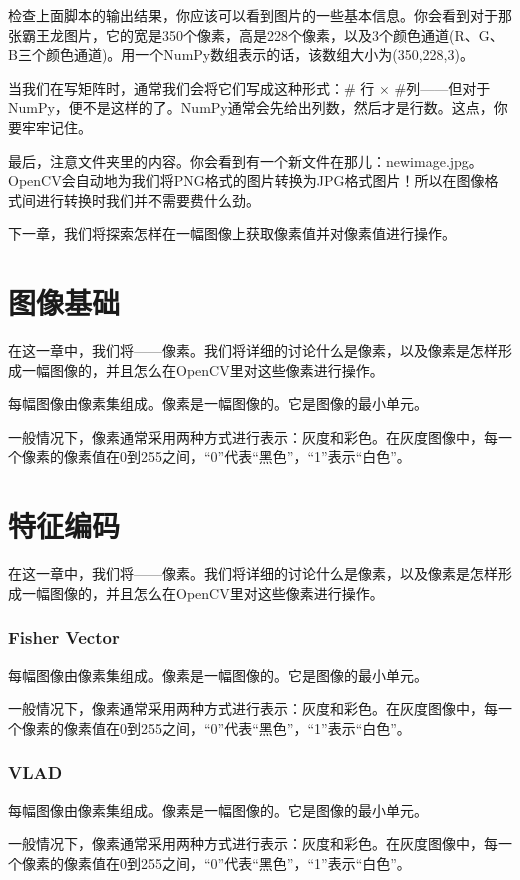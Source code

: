 \documentclass[color=green,mathpazo,titlestyle=hang]{elegantbook}
\begin{document}
检查上面脚本的输出结果，你应该可以看到图片的一些基本信息。你会看到对于那张霸王龙图片，它的宽是350个像素，高是228个像素，以及3个颜色通道(R、G、B三个颜色通道)。用一个NumPy数组表示的话，该数组大小为(350,228,3)。

当我们在写矩阵时，通常我们会将它们写成这种形式：\# 行 $\times$ \#列——但对于NumPy，便不是这样的了。NumPy通常会先给出列数，然后才是行数。这点，你要牢牢记住。

最后，注意文件夹里的内容。你会看到有一个新文件在那儿：newimage.jpg。OpenCV会自动地为我们将PNG格式的图片转换为JPG格式图片！所以在图像格式间进行转换时我们并不需要费什么劲。

下一章，我们将探索怎样在一幅图像上获取像素值并对像素值进行操作。

\chapter{图像基础}

在这一章中，我们将{\color{red}{审查图像的积木}}——像素。我们将详细的讨论什么是像素，以及像素是怎样形成一幅图像的，并且怎么在OpenCV里对这些像素进行操作。

每幅图像由像素集组成。像素是一幅图像的{\color{red}{原材料，积木}}。它是图像的最小单元。

一般情况下，像素通常采用两种方式进行表示：灰度和彩色。在灰度图像中，每一个像素的像素值在0到255之间，“0”代表“黑色”，“1”表示“白色”。

\chapter{特征编码}

在这一章中，我们将{\color{red}{审查图像的积木}}——像素。我们将详细的讨论什么是像素，以及像素是怎样形成一幅图像的，并且怎么在OpenCV里对这些像素进行操作。

\subsection{Fisher Vector}

每幅图像由像素集组成。像素是一幅图像的{\color{red}{原材料，积木}}。它是图像的最小单元。

一般情况下，像素通常采用两种方式进行表示：灰度和彩色。在灰度图像中，每一个像素的像素值在0到255之间，“0”代表“黑色”，“1”表示“白色”。

\subsection{VLAD}

每幅图像由像素集组成。像素是一幅图像的{\color{red}{原材料，积木}}。它是图像的最小单元。

一般情况下，像素通常采用两种方式进行表示：灰度和彩色。在灰度图像中，每一个像素的像素值在0到255之间，“0”代表“黑色”，“1”表示“白色”。



\end{document}
